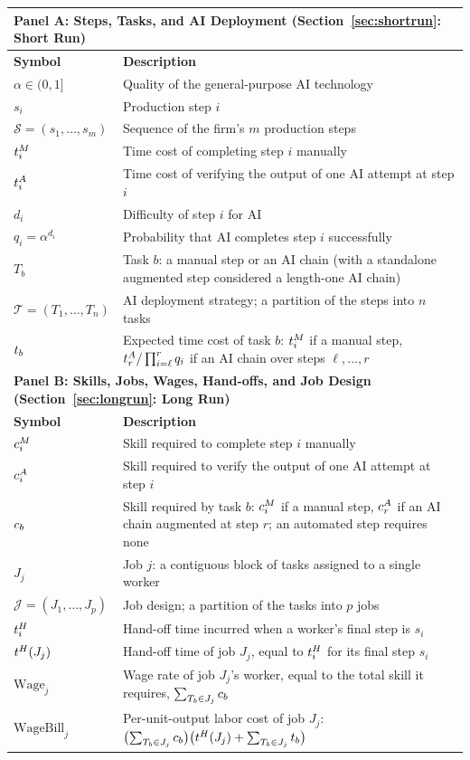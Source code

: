 \begin{tabularx}{\textwidth}{l X}
\toprule
\multicolumn{2}{l}{\textbf{Panel A: Steps, Tasks, and AI Deployment (Section~\ref{sec:shortrun}: Short Run)}} \\
\midrule
\textbf{Symbol} & \textbf{Description} \\
\midrule
$\alpha \in (0,1]$ & Quality of the general-purpose AI technology \\
$s_i$ & Production step $i$ \\
$\mathcal{S} = (s_1, \dotsc, s_m)$ & Sequence of the firm's $m$ production steps \\
$t^{M}_{i}$ & Time cost of completing step $i$ manually \\
$t^{A}_{i}$ & Time cost of verifying the output of one AI attempt at step $i$ \\
$d_i$ & Difficulty of step $i$ for AI \\
$q_i = \alpha^{d_i}$ & Probability that AI completes step $i$ successfully \\
$T_b$ & Task $b$: a manual step or an AI chain (with a standalone augmented step considered a length-one AI chain) \\
$\mathcal{T} = (T_1, \dotsc, T_n)$ & AI deployment strategy; a partition of the steps into $n$ tasks \\
$t_{b}$ & Expected time cost of task $b$: $t^{M}_{i}$ if a manual step, $t^{A}_{r}/\prod_{i=\ell}^{r} q_i$ if an AI chain over steps $\ell, \dotsc, r$ \\
\midrule
\multicolumn{2}{l}{\textbf{Panel B: Skills, Jobs, Wages, Hand-offs, and Job Design (Section~\ref{sec:longrun}: Long Run)}} \\
\midrule
\textbf{Symbol} & \textbf{Description} \\
\midrule
$c^{M}_{i}$ & Skill required to complete step $i$ manually \\
$c^{A}_{i}$ & Skill required to verify the output of one AI attempt at step $i$ \\
$c_{b}$ & Skill required by task $b$: $c^{M}_{i}$ if a manual step, $c^{A}_{r}$ if an AI chain augmented at step $r$; an automated step requires none \\
$J_j$ & Job $j$: a contiguous block of tasks assigned to a single worker \\
$\mathcal{J} = (J_1, \dotsc, J_p)$ & Job design; a partition of the tasks into $p$ jobs \\
$t^{H}_{i}$ & Hand-off time incurred when a worker's final step is $s_i$ \\
$t^{H}_{}(J_j)$ & Hand-off time of job $J_j$, equal to $t^{H}_{i}$ for its final step $s_i$ \\
$\text{Wage}_j$ & Wage rate of job $J_j$'s worker, equal to the total skill it requires, $\sum_{T_b \in J_j} c_{b}$ \\
$\text{WageBill}_j$ & Per-unit-output labor cost of job $J_j$: $\bigl(\sum_{T_b \in J_j} c_{b}\bigr)\bigl(t^{H}_{}(J_j) + \sum_{T_b \in J_j} t_{b}\bigr)$ \\
\bottomrule
\end{tabularx}

